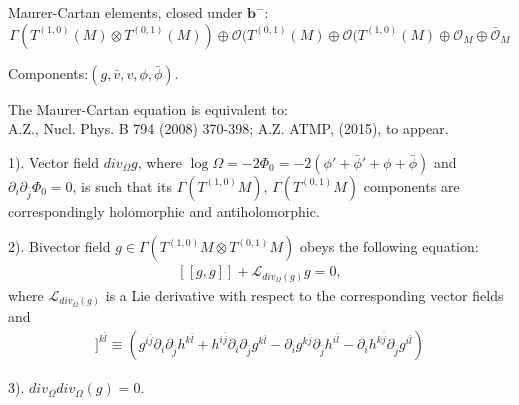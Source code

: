 \documentclass[9pt]{beamer}
\def\b{\bar}
\newcommand{\p}{\partial}
\def\b{\bar}
\begin{document}
\begin{frame}
Maurer-Cartan elements, closed under $\mathbf{b}^-$: 
 $$
\Gamma(T^{(1,0)}(M)\otimes T^{(0,1)}(M))\oplus \mathcal{O}(T^{(0,1)}(M)\oplus \mathcal{O}(T^{(1,0)}(M)\oplus
\mathcal{O}_M\oplus \bar{\mathcal{O}}_M$$  

Components:$(g, \b v, v, \phi, \b \phi)$.\\

\vspace*{2mm}

The Maurer-Cartan equation is equivalent to:\\
\hfill {\color{blue} \tiny {A.Z., Nucl. Phys. B 794 (2008) 370-398; A.Z. ATMP, (2015), to appear.}}
\vspace{2mm}

1). Vector field $div_{\Omega}g$, where  $\log{\Omega}=-2\Phi_0=-2(\phi'+\b \phi'+\phi+\b \phi)$ and $\p_i{\p}_{\b j}\Phi_0=0$, is such that its $\Gamma(T^{(1,0)} M)$, $\Gamma(T^{(0,1)} M)$ components are correspondingly holomorphic and antiholomorphic.

2).  Bivector field $g\in \Gamma(T^{(1,0)}M\otimes T^{(0,1)}M)$ obeys the following equation: 
\begin{eqnarray*}\label{bil}
[[g,g]]+\mathcal{L}_{div_{\Omega}(g)}g=0, 
\end{eqnarray*} 
where $\mathcal{L}_{div_{\Omega}(g)}$ is a Lie derivative with respect to 
the corresponding vector fields and\\

\begin{eqnarray*}
[[g,h]]^{k\b l}\equiv
(g^{i\b j}\p_i\p_{\b j}h^{k\b l}+h^{i\b j}\p_i\p_{\b j}g^{k\b l}-\p_ig^{k\b j}\p_{\b j}h^{i\b l}-
\p_ih^{k\b j}\p_{\b j}g^{i\b l})\nonumber
\end{eqnarray*}

3). $div_{\Omega}div_{\Omega}(g)=0$.\\


\end{frame}
\end{document}
